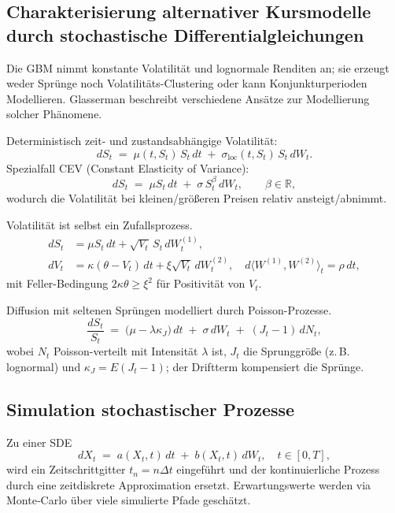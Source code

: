 \subsection{Charakterisierung alternativer Kursmodelle durch stochastische Differentialgleichungen}

Die GBM nimmt konstante Volatilität und lognormale Renditen an; sie erzeugt weder 
Sprünge noch Volatilitäts-Clustering oder kann Konjunkturperioden Modellieren.
Glasserman \cite{glasserman2003monte} beschreibt verschiedene Ansätze zur Modellierung solcher Phänomene. 

\begin{bsp}
Deterministisch zeit- und zustandsabhängige Volatilität:
$$
dS_t \;=\; \mu(t,S_t)\,S_t\,dt \;+\; \sigma_{\mathrm{loc}}(t,S_t)\,S_t\,dW_t.
$$
Spezialfall CEV (Constant Elasticity of Variance):
$$
dS_t \;=\; \mu S_t\,dt \;+\; \sigma\,S_t^{\beta}\,dW_t,\qquad \beta\in\mathbb R,
$$
wodurch die Volatilität bei kleinen/größeren Preisen relativ ansteigt/abnimmt.
\end{bsp}

\begin{bsp}
Volatilität ist selbst ein Zufallsprozess.
$$
\begin{aligned}
dS_t &= \mu S_t\,dt + \sqrt{V_t}\,S_t\,dW_t^{(1)},\\
dV_t &= \kappa(\theta - V_t)\,dt + \xi\sqrt{V_t}\,dW_t^{(2)},\quad d \langle W^{(1)},W^{(2)}\rangle_t=\rho\,dt,
\end{aligned}
$$
mit Feller-Bedingung $2\kappa\theta\ge \xi^2$ für Positivität von $V_t$.
\end{bsp}

\begin{bsp}
Diffusion mit seltenen Sprüngen modelliert durch Poisson-Prozesse.
$$
\frac{dS_t}{S_t} \;=\; \big(\mu - \lambda \kappa_J\big)\,dt \;+\; \sigma\,dW_t \;+\; (J_t-1)\,dN_t,
$$
wobei $N_t$ Poisson-verteilt mit Intensität $\lambda$ ist, $J_t$ die Sprunggröße (z.\,B. lognormal) 
und $\kappa_J= E(J_t-1)$; der Driftterm kompensiert die Sprünge.
\end{bsp}

\subsection{Simulation stochastischer Prozesse}
Zu einer SDE
$$
dX_t \;=\; a(X_t,t)\,dt \;+\; b(X_t,t)\,dW_t,\quad t\in[0,T],
$$
wird ein Zeitschrittgitter $t_n=n\Delta t$ eingeführt und der kontinuierliche Prozess durch eine zeitdiskrete Approximation ersetzt. Erwartungswerte werden via Monte‑Carlo über viele simulierte Pfade geschätzt.

